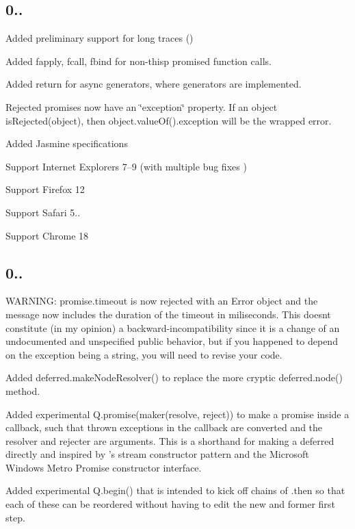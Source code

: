 \subsection*{0..}


\begin{DoxyItemize}
\item Added preliminary support for long traces ()
\item Added {\ttfamily fapply}, {\ttfamily fcall}, {\ttfamily fbind} for non-\/thisp promised function calls.
\item Added {\ttfamily return} for async generators, where generators are implemented.
\item Rejected promises now have an \char`\"{}exception\char`\"{} property. If an object is\+Rejected(object), then object.\+value\+Of().exception will be the wrapped error.
\item Added Jasmine specifications
\item Support Internet Explorers 7–9 (with multiple bug fixes )
\item Support Firefox 12
\item Support Safari 5..
\item Support Chrome 18
\end{DoxyItemize}

\subsection*{0..}


\begin{DoxyItemize}
\item W\+A\+R\+N\+I\+NG\+: {\ttfamily promise.\+timeout} is now rejected with an {\ttfamily Error} object and the message now includes the duration of the timeout in miliseconds. This doesn\textquotesingle{}t constitute (in my opinion) a backward-\/incompatibility since it is a change of an undocumented and unspecified public behavior, but if you happened to depend on the exception being a string, you will need to revise your code.
\item Added {\ttfamily deferred.\+make\+Node\+Resolver()} to replace the more cryptic {\ttfamily deferred.\+node()} method.
\item Added experimental {\ttfamily Q.\+promise(maker(resolve, reject))} to make a promise inside a callback, such that thrown exceptions in the callback are converted and the resolver and rejecter are arguments. This is a shorthand for making a deferred directly and inspired by ’s stream constructor pattern and the Microsoft Windows Metro Promise constructor interface.
\item Added experimental {\ttfamily Q.\+begin()} that is intended to kick off chains of {\ttfamily .then} so that each of these can be reordered without having to edit the new and former first step.
\end{DoxyItemize}

